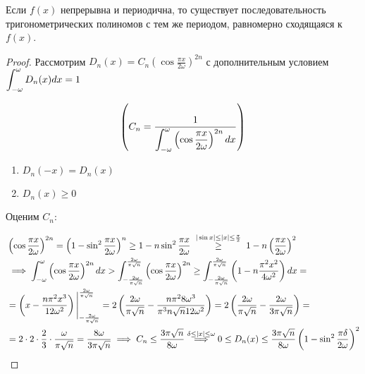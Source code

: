 \begin{theorem}
    Если $f(x)$ непрерывна и периодична, то существует последовательность
    тригонометрических полиномов с тем же периодом, равномерно сходящаяся
    к $f(x)$.
\end{theorem}
\begin{proof}
    Рассмотрим $D_n(x) = C_n(\cos \frac{\pi x}{2 \omega})^{2n}$ с дополнительным
    условием $\displaystyle\int_{-\omega}^\omega D_n(x) dx = 1$

    \[ \left(C_n = \frac{1}{\displaystyle\int_{-\omega}^\omega \left(\cos \frac{\pi x}{2 \omega}\right)^{2n} dx}\right) \]

    \begin{enumerate}
        \item $D_n(-x) = D_n(x)$
        \item $D_n(x) \geq 0$
    \end{enumerate}

    Оценим $C_n$:

    \begin{align*}
        &\left(\cos \frac{\pi x}{2 \omega}\right)^{2n} = 
        \left(1 - \sin^2 \frac{\pi x}{2 \omega}\right)^n \geq
        1 - n \sin^2 \frac{\pi x}{2 \omega} \;
        \stackrel{|\sin x| \leq |x| \leq \frac{\pi}{2}}{\geq} \;
        1 - n \left(\frac{\pi x}{2 \omega}\right)^2 \\
        &\implies \displaystyle\int_{-\omega}^\omega \left(\cos \frac{\pi x}{2 \omega}\right)^{2n} dx >
        \displaystyle\int_{-\frac{2 \omega}{\pi \sqrt{n}}}^{\frac{2 \omega}{\pi \sqrt{n}}} \left(\cos \frac{\pi x}{2 \omega}\right)^{2n} \geq
        \displaystyle\int_{-\frac{2 \omega}{\pi \sqrt{n}}}^{\frac{2 \omega}{\pi \sqrt{n}}} \left( 1 - n \frac{\pi^2 x^2}{4 \omega^2} \right) dx = \\
        &= \left( x - \frac{n \pi^2 x^3}{12 \omega^2} \right) \Bigg|_{-\frac{2 \omega}{\pi \sqrt{n}}}^{\frac{2 \omega}{\pi \sqrt{n}}} =
        2 \left( \frac{2 \omega}{\pi \sqrt{n}} - \frac{n \pi^2 8 \omega^3}{\pi^3 n \sqrt{n} 12 \omega^2} \right) =
        2 \left( \frac{2 \omega}{\pi \sqrt{n}} - \frac{2 \omega}{3 \pi \sqrt{n}} \right) = \\
        &= 2 \cdot 2 \cdot \frac{2}{3} \cdot \frac{\omega}{\pi \sqrt{n}} = \frac{8 \omega}{3 \pi \sqrt{n}}
        \implies C_n \leq \frac{3 \pi \sqrt{n}}{8 \omega} 
        \stackrel{\delta \leq |x| \leq \omega}{\implies} 0 \leq D_n(x) \leq \frac{3 \pi \sqrt{n}}{8 \omega} \left(1 - \sin^2 \frac{\pi \delta}{2 \omega}\right)^2
    \end{align*}


\end{proof}
